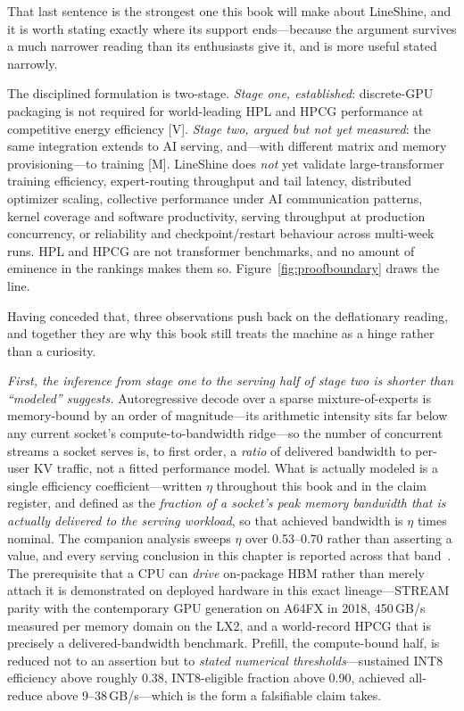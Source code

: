 That last sentence is the strongest one this book will make about LineShine, and it is worth stating exactly where its support ends---because the argument survives a much narrower reading than its enthusiasts give it, and is more useful stated narrowly.



The disciplined formulation is two-stage. \emph{Stage one, established}: discrete-GPU packaging is not required for world-leading HPL and HPCG performance at competitive energy efficiency [V]. \emph{Stage two, argued but not yet measured}: the same integration extends to AI serving, and---with different matrix and memory provisioning---to training [M]. LineShine does \emph{not} yet validate large-transformer training efficiency, expert-routing throughput and tail latency, distributed optimizer scaling, collective performance under AI communication patterns, kernel coverage and software productivity, serving throughput at production concurrency, or reliability and checkpoint/restart behaviour across multi-week runs. HPL and HPCG are not transformer benchmarks, and no amount of eminence in the rankings makes them so. Figure~\ref{fig:proofboundary} draws the line.

Having conceded that, three observations push back on the deflationary reading, and together they are why this book still treats the machine as a hinge rather than a curiosity.

\emph{First, the inference from stage one to the serving half of stage two is shorter than ``modeled'' suggests.} Autoregressive decode over a sparse mixture-of-experts is memory-bound by an order of magnitude---its arithmetic intensity sits far below any current socket's compute-to-bandwidth ridge---so the number of concurrent streams a socket serves is, to first order, a \emph{ratio} of delivered bandwidth to per-user KV traffic, not a fitted performance model. What is actually modeled is a single efficiency coefficient---written $\eta$ throughout this book and in the claim register, and defined as the \emph{fraction of a socket's peak memory bandwidth that is actually delivered to the serving workload}, so that achieved bandwidth is $\eta$ times nominal. The companion analysis sweeps $\eta$ over 0.53--0.70 rather than asserting a value, and every serving conclusion in this chapter is reported across that band~\cite{dhm-long}. The prerequisite that a CPU can \emph{drive} on-package HBM rather than merely attach it is demonstrated on deployed hardware in this exact lineage---STREAM parity with the contemporary GPU generation on A64FX in 2018, 450\,GB/s measured per memory domain on the LX2, and a world-record HPCG that is precisely a delivered-bandwidth benchmark. Prefill, the compute-bound half, is reduced not to an assertion but to \emph{stated numerical thresholds}---sustained INT8 efficiency above roughly 0.38, INT8-eligible fraction above 0.90, achieved all-reduce above 9--38\,GB/s---which is the form a falsifiable claim takes.


